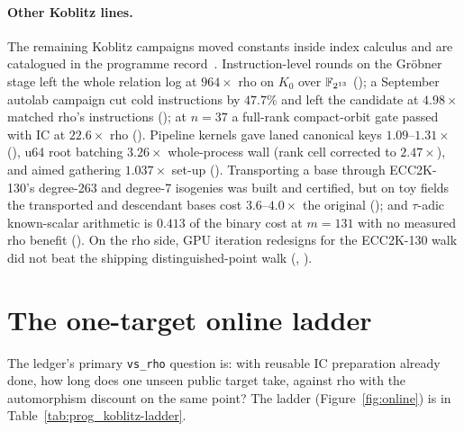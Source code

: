 \paragraph{Other Koblitz lines.} The remaining Koblitz campaigns moved
constants inside index calculus and are catalogued in
the programme record~\cite{icprogram2026}. Instruction-level rounds on the Gröbner stage
left the whole relation log at $964\times$ rho on $K_0$ over $\mathbb{F}_{2^{13}}$
(); a September autolab
campaign cut cold instructions by $47.7\%$ and left the candidate at
$4.98\times$ matched rho's instructions ();
at $n=37$ a full-rank compact-orbit gate passed with IC at $22.6\times$ rho
().
Pipeline kernels gave laned canonical keys $1.09$--$1.31\times$
(), u64 root batching
$3.26\times$ whole-process wall (rank cell corrected to $2.47\times$), and
aimed gathering $1.037\times$ set-up ().
Transporting a base through ECC2K-130's degree-263 and degree-7 isogenies
was built and certified, but on toy fields the transported and descendant
bases cost $3.6$--$4.0\times$ the original
(); and $\tau$-adic
known-scalar arithmetic is $0.413$ of the binary cost at $m=131$ with no
measured rho benefit
().
On the rho side, GPU iteration redesigns for the ECC2K-130 walk did not
beat the shipping distinguished-point walk
(,
).

\section{The one-target online ladder}

The ledger's primary \texttt{vs\_rho} question is: with reusable IC
preparation already done, how long does one unseen public target take,
against rho with the automorphism discount on the same point? The ladder
(Figure~\ref{fig:online}) is in Table~\ref{tab:prog_koblitz-ladder}.

